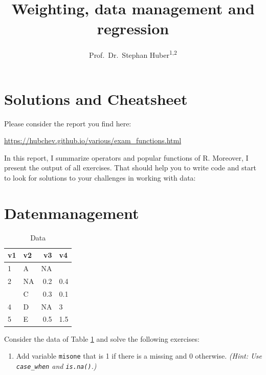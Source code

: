 \documentclass[
  doc]{apa6}
\title{Weighting, data management and regression}
\author{Prof.~Dr.~Stephan Huber\textsuperscript{1,2}}
\date{}
\affiliation{\vspace{0.5cm}\textsuperscript{1} Fresenius University of Applied Science\\\textsuperscript{2} Charlotte Fresenius University}
\providecommand{\tightlist}{%
  \setlength{\itemsep}{0pt}\setlength{\parskip}{0pt}}
\begin{document}
\maketitle

\newpage

\hypertarget{solutions-and-cheatsheet}{%
\section{Solutions and Cheatsheet}\label{solutions-and-cheatsheet}}

Please consider the report you find here:

\url{https://hubchev.github.io/various/exam_functions.html}

In this report, I summarize operators and popular functions of R. Moreover, I present the output of all exercises. That should help you to write code and start to look for solutions to your challenges in working with data:

\hypertarget{datenmanagement}{%
\section{Datenmanagement}\label{datenmanagement}}

\begin{table}

\caption{\label{tab:data1}Data}
\centering
\begin{tabular}[t]{l|l|r|l}
\hline
v1 & v2 & v3 & v4\\
\hline
1 & A & NA & \\
\hline
2 & NA & 0.2 & 0.4\\
\hline
 & C & 0.3 & 0.1\\
\hline
4 & D & NA & 3\\
\hline
5 & E & 0.5 & 1.5\\
\hline
\end{tabular}
\end{table}

Consider the data of Table \ref{tab:data1} and solve the following exercises:

\begin{enumerate}
\def\labelenumi{\alph{enumi})}
\tightlist
\item
  Add variable \texttt{misone} that is 1 if there is a missing and 0 otherwise.
  \emph{(Hint: Use \texttt{case\_when} and \texttt{is.na()}.)}
\end{enumerate}

\newpage
\end{document}
